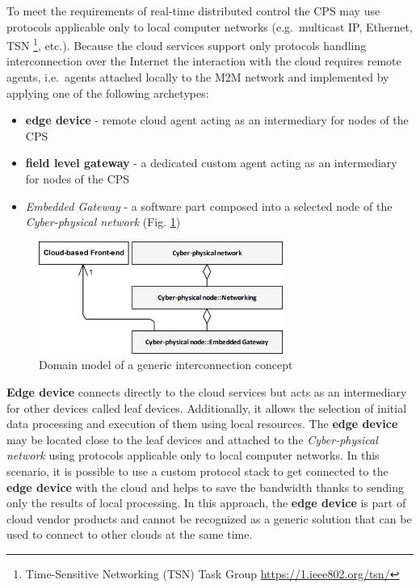 \documentclass{article}
\begin{document}
To meet the requirements of real-time distributed control the CPS may use protocols applicable only to local computer networks (e.g.~multicast IP, Ethernet, TSN \footnote{Time-Sensitive Networking (TSN) Task Group \url{https://1.ieee802.org/tsn/}}, etc.). Because the cloud services support only protocols handling interconnection over the Internet the interaction with the cloud requires remote agents, i.e.~agents attached locally to the M2M network and implemented by applying one of the following archetypes:

\begin{itemize}
      \item \textbf{edge device} - remote cloud agent acting as an intermediary for nodes of the CPS
      \item \textbf{field level gateway} - a dedicated custom agent acting as an intermediary for nodes of the CPS
      \item \emph{Embedded Gateway} - a software part composed into a selected node of the \emph{Cyber-physical network} (Fig. \ref{figure1.StrategyDomainModel})
\end{itemize}

\begin{figure}
      \centering
      \includegraphics[width=8cm]{../../.Media/StrategyDomainModel.png}
      \caption{Domain model of a generic interconnection concept}\label{figure1.StrategyDomainModel}
\end{figure}

\textbf{Edge device} connects directly to the cloud services but acts as an intermediary for other devices called leaf devices. Additionally, it allows the selection of initial data processing and execution of them using local resources. The \textbf{edge device} may be located close to the leaf devices and attached to the \emph{Cyber-physical network} using protocols applicable only to local computer networks. In this scenario, it is possible to use a custom protocol stack to get connected to the \textbf{edge device} with the cloud and helps to save the bandwidth thanks to sending only the results of local processing. In this approach, the \textbf{edge device} is part of cloud vendor products and cannot be recognized as a generic solution that can be used to connect to other clouds at the same time.
\end{document}
